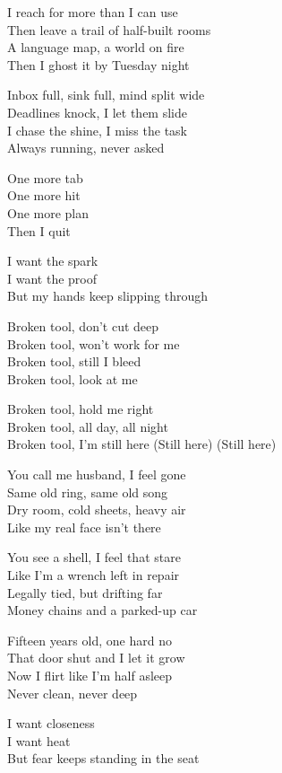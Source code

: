 \begin{lyrics}
I reach for more than I can use\\
Then leave a trail of half-built rooms\\
A language map, a world on fire\\
Then I ghost it by Tuesday night

Inbox full, sink full, mind split wide\\
Deadlines knock, I let them slide\\
I chase the shine, I miss the task\\
Always running, never asked

One more tab\\
One more hit\\
One more plan\\
Then I quit

I want the spark\\
I want the proof\\
But my hands keep slipping through

Broken tool, don’t cut deep\\
Broken tool, won’t work for me\\
Broken tool, still I bleed\\
Broken tool, look at me

Broken tool, hold me right\\
Broken tool, all day, all night\\
Broken tool, I’m still here
(Still here)
(Still here)

You call me husband, I feel gone\\
Same old ring, same old song\\
Dry room, cold sheets, heavy air\\
Like my real face isn’t there

You see a shell, I feel that stare\\
Like I’m a wrench left in repair\\
Legally tied, but drifting far\\
Money chains and a parked-up car

Fifteen years old, one hard no\\
That door shut and I let it grow\\
Now I flirt like I’m half asleep\\
Never clean, never deep

I want closeness\\
I want heat\\
But fear keeps standing in the seat


\end{lyrics}
